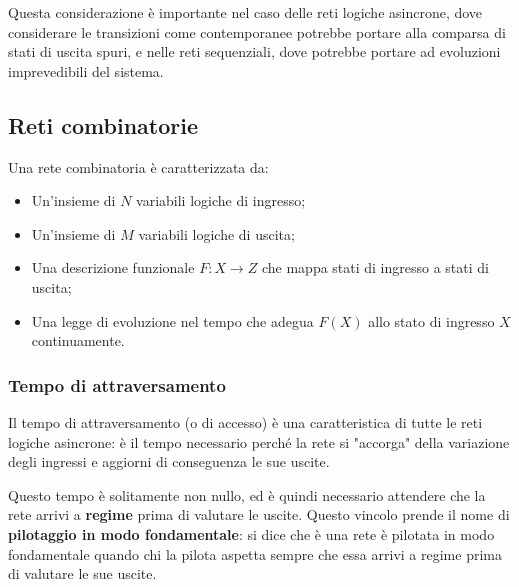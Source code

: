 \documentclass[a4paper,11pt]{article}
\begin{document}
Questa considerazione è importante nel caso delle reti logiche asincrone, dove considerare le transizioni come contemporanee potrebbe portare alla comparsa di stati di uscita spuri, e nelle reti sequenziali, dove potrebbe portare ad evoluzioni imprevedibili del sistema.

\subsection{Reti combinatorie}
Una rete combinatoria è caratterizzata da:
\begin{itemize}
	\item Un'insieme di $N$ variabili logiche di ingresso;
	\item Un'insieme di $M$ variabili logiche di uscita;
	\item Una descrizione funzionale $F: X \rightarrow Z$ che mappa stati di ingresso a stati di uscita;
	\item Una legge di evoluzione nel tempo che adegua $F(X)$ allo stato di ingresso $X$ continuamente.
\end{itemize}

\subsubsection{Tempo di attraversamento}
Il tempo di attraversamento (o di accesso) è una caratteristica di tutte le reti logiche asincrone: è il tempo necessario perché la rete si "accorga" della variazione degli ingressi e aggiorni di conseguenza le sue uscite.

Questo tempo è solitamente non nullo, ed è quindi necessario attendere che la rete arrivi a \textbf{regime} prima di valutare le uscite.
Questo vincolo prende il nome di \textbf{pilotaggio in modo fondamentale}: si dice che è una rete è pilotata in modo fondamentale quando chi la pilota aspetta sempre che essa arrivi a regime prima di valutare le sue uscite.
\end{document}
